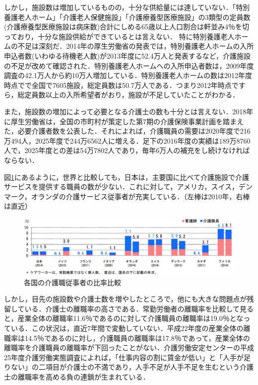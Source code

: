 しかし，施設数は増加しているものの，十分な供給量には達していない．「特別養護老人ホーム」「介護老人保健施設」「介護療養型医療施設」の3類型の定員数(介護療養型医療施設は病床数)合計にしめる65歳以上人口割合は軒並み4％を切っており，十分な施設供給ができているとは言えない\cite{lack_facility_1}．
特に特別養護老人ホームの不足は深刻だ．2014年の厚生労働省の発表では，特別養護老人ホームの入所申込者数(いわゆる待機老人数)が2013年度に52.4万人と発表するなど，介護施設の不足が改めて確認された．特別養護老人ホームへの入所申込者数は，2009年度調査の42.1万人から約10万人増加している．特別養護老人ホームの数は2012年度時点でで全国で7605施設，総定員数は50.7万人である．つまり2012年時点ですら，総定員数以上の入所希望者がおり，施設が不足していたことがわかる\cite{lack_facility_2}．

また，施設数の増加によって必要となる介護士の数も十分とは言えない．2018年に厚生労働省は，全国の市町村が策定した第7期の介護保険事業計画を踏まえた，必要介護者数を公表した．それによれば，介護職員の需要は2020年度で216万494人，2025年度で244万6562人に増える．足下の2016年度の実績は189万8760人で，2025年度との差は54万7802人であり，毎年6万人の補充をし続けなければならない．

図\ref{care_worker_comparison}にあるように，世界と比較しても，日本は，主要国に比べて介護施設で介護サービスを提供する職員の数が少ない．これに対して，アメリカ，スイス，デンマーク，オランダの介護サービス従事者が充実している．（左棒は2010年，右棒は直近）\cite{care_worker_comparison}

\begin{figure}[htb]
 \begin{center}
 \includegraphics[scale=0.3]{figures/care_worker_comparison.png}
 \caption[各国の介護職従事者の比率比較]{各国の介護職従事者の比率比較 \label{care_worker_comparison}}
 \end{center}
\end{figure}

しかし，目先の施設数や介護士数を増やしたところで，他にも大きな問題点が残留している．介護士の離職率の高さである．常勤労働者の離職率を比較して見ると，産業全体の離職率11.6％であるのに対して介護職員の離職率は19.0％となっている．この状況は，直近7年間で変動していない．平成22年度の産業全体の離職率は14.5％であるのに対し，介護職員の離職率は17.8％であって，産業全体の離職率を介護職員の離職率が下回ったことがない\cite{turnover_rate}．介護労働安定センターの平成25年度介護労働実態調査によれば，「仕事内容の割に賃金が低い」と「人手が足りない」の二項目が介護士の不満であり，人手不足が人手不足を生むという介護士の離職率を高める負の連鎖が生まれている．

